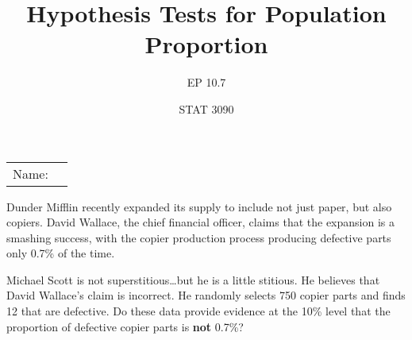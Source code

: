 \documentclass[noanswers]{exam}
\title{Hypothesis Tests for Population Proportion}
\author{EP 10.7}
\date{STAT 3090}
\begin{document}
\noindent\begin{tabular}{@{}p{.5in}p{2.5in}@{}}
Name: & \hrulefill 
\end{tabular}

\vspace{3mm}

\begin{questions} 

\question Dunder Mifflin recently expanded its supply to include not just paper, but also copiers. David Wallace, the chief financial officer, claims that the expansion is a smashing success, with the copier production process producing defective parts only 0.7\% of the time.
    
    \vspace{3mm}
        
    Michael Scott is not superstitious\dots but he is a little stitious. He believes that David Wallace's claim is incorrect. He randomly selects 750 copier parts and finds 12 that are defective. Do these data provide evidence at the 10\% level that the proportion of defective copier parts is \textbf{not} 0.7\%?

\vspace{3mm}

\end{questions}
\end{document}

